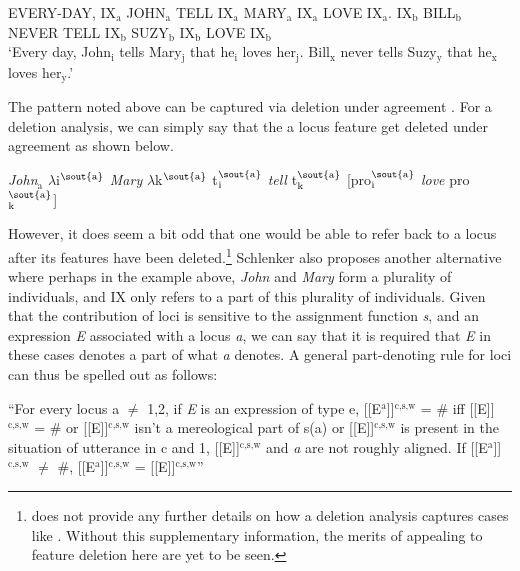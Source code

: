 \documentclass[output=paper,
modfonts
]{langscibook}
\begin{document}
\begin{exe} 
	\ex \label{ex:irani:76} EVERY-DAY, IX$_\text{a}$ JOHN$_\text{a}$ TELL IX$_\text{a}$ MARY$_\text{a}$ IX$_\text{a}$ LOVE IX$_\text{a}$. IX$_\text{b}$ BILL$_\text{b}$ NEVER TELL IX$_\text{b}$ SUZY$_\text{b}$ IX$_\text{b}$ LOVE IX$_\text{b}$ \\
	`Every day, John$_\text{i}$ tells Mary$_\text{j}$ that he$_\text{i}$ loves her$_\text{j}$. Bill$_\text{x}$ never tells Suzy$_\text{y}$ that he$_\text{x}$ loves her$_\text{y}$.' \citep[1073]{Schlenker2014}
\end{exe} 

The pattern noted above can be captured via deletion under agreement . For a deletion analysis, we can simply say that the a locus feature get deleted under agreement as shown below. 

\begin{exe}
	\ex \textit{John}$_\text{a}$ $\lambda$i$^{\text{\sout{a}}}$ \textit{Mary} $\lambda$k$^{\text{\sout{a}}}$ t$_\text{i}^{\text{\sout{a}}}$ \textit{tell} t$_\text{k}^{\text{\sout{a}}}$ [pro$_{\text{i}}^{\text{\sout{a}}}$ \textit{love} pro$_{\text{k}}^{\text{\sout{a}}}$] \citep[1079]{Schlenker2014}
\end{exe}

However, it does seem a bit odd that one would be able to refer back to a locus after its features have been deleted.\footnote{\citet{Schlenker2014} does not provide any further details on how a deletion analysis captures cases like . Without this supplementary information, the merits of appealing to feature deletion here are yet to be seen.} Schlenker also proposes another alternative where perhaps in the example above, \textit{John} and \textit{Mary} form a plurality of individuals, and IX only refers to a part of this plurality of individuals. Given that the contribution of loci is sensitive to the assignment function \textit{s}, and an expression \textit{E} associated with a locus \textit{a}, we can say that it is required that \textit{E} in these cases denotes a part of what \textit{a} denotes. A general part-denoting rule for loci can thus be spelled out as follows:  

\begin{exe}
	\ex \label{ex:irani:78} ``For every locus a \(\neq\) 1,2, if \textit{E} is an expression of type e, {[}[E$^\text{a}$]{]}$^\text{{c,s,w}}$ = \# iff {[}[E]{]}$^\text{{c,s,w}}$ =  \# or {[}[E]{]}$^\text{{c,s,w}}$ isn't a mereological part of s(a) or {[}[E]{]}$^\text{{c,s,w}}$ is present in the situation of utterance in c and 1, {[}[E]{]}$^\text{{c,s,w}}$ and \textit{a} are not roughly aligned. If {[}[E$^\text{a}$]{]}$^\text{{c,s,w}}$ \(\neq\) \#, {[}[E$^\text{a}$]{]}$^\text{{c,s,w}}$ = {[}[E]{]}$^\text{{c,s,w}}$'' \citep[1080]{Schlenker2014}
\end{exe}
\end{document}
